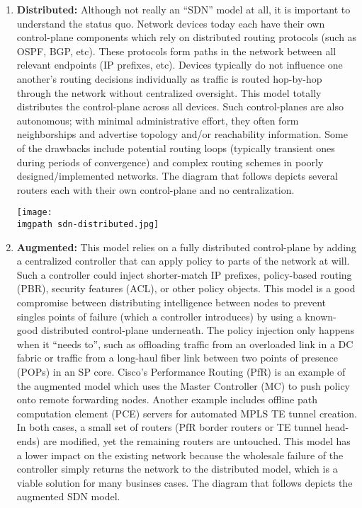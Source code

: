 \begin{enumerate}
  \item \textbf{Distributed:} Although not really an ``SDN'' model at all, it
  is important to understand the status quo. Network devices today each have
  their own control-plane components which rely on distributed routing
  protocols (such as OSPF, BGP, etc). These protocols form paths in the
  network between all relevant endpoints (IP prefixes, etc). Devices typically
  do not influence one another’s routing decisions individually as traffic is
  routed hop-by-hop through the network without centralized oversight. This
  model totally distributes the control-plane across all devices. Such
  control-planes are also autonomous; with minimal administrative effort, they
  often form neighborships and advertise topology and/or reachability
  information. Some of the drawbacks include potential routing loops
  (typically transient ones during periods of convergence) and complex routing
  schemes in poorly designed/implemented networks. The diagram that follows depicts
  several routers each with their own control-plane and no centralization.

    \begin{minipage}[t]{\linewidth}
	  \centering
      \texttt{[image: \\imgpath sdn-distributed.jpg]}
    \end{minipage}

  \item \textbf{Augmented:} This model relies on a fully distributed
  control-plane by adding a centralized controller that can apply policy to
  parts of the network at will. Such a controller could inject shorter-match
  IP prefixes, policy-based routing (PBR), security features (ACL), or other
  policy objects. This model is a good compromise between distributing
  intelligence between nodes to prevent singles points of failure (which a
  controller introduces) by using a known-good distributed control-plane
  underneath. The policy injection only happens when it ``needs to'', such as
  offloading traffic from an overloaded link in a DC fabric or traffic from a
  long-haul fiber link between two points of presence (POPs) in an SP core.
  Cisco’s Performance Routing (PfR) is an example of the augmented model which
  uses the Master Controller (MC) to push policy onto remote forwarding nodes.
  Another example includes offline path computation element (PCE) servers for
  automated MPLS TE tunnel creation. In both cases, a small set of routers
  (PfR border routers or TE tunnel head-ends) are modified, yet the remaining
  routers are untouched. This model has a lower impact on the existing network
  because the wholesale failure of the controller simply returns the network
  to the distributed model, which is a viable solution for many businses
  cases. The diagram that follows depicts the augmented SDN model.


\end{enumerate}
